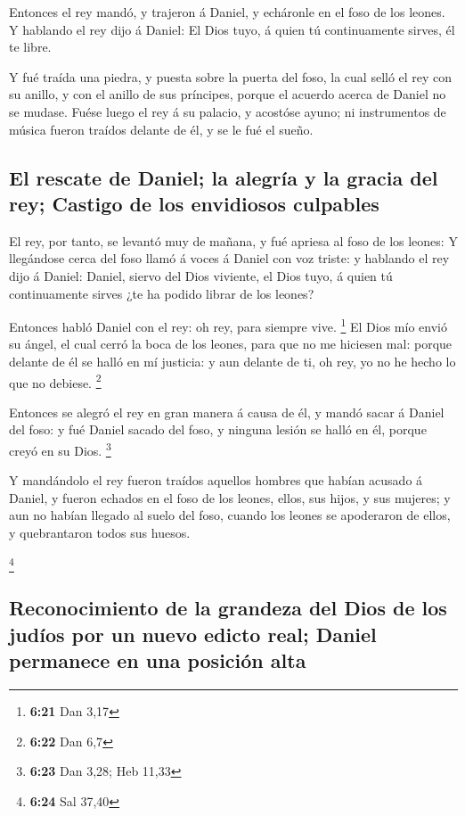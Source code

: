  Entonces el rey mandó, y trajeron á Daniel, y echáronle
en el foso de los leones. Y hablando el rey dijo á Daniel: El Dios tuyo,
á quien tú continuamente sirves, él te libre.

 Y fué traída una piedra, y puesta sobre la puerta del
foso, la cual selló el rey con su anillo, y con el anillo de sus
príncipes, porque el acuerdo acerca de Daniel no se mudase.
 Fuése luego el rey á su palacio, y acostóse ayuno; ni
instrumentos de música fueron traídos delante de él, y se le fué el
sueño.

\hypertarget{el-rescate-de-daniel-la-alegruxeda-y-la-gracia-del-rey-castigo-de-los-envidiosos-culpables}{%
\subsection{El rescate de Daniel; la alegría y la gracia del rey;
Castigo de los envidiosos
culpables}\label{el-rescate-de-daniel-la-alegruxeda-y-la-gracia-del-rey-castigo-de-los-envidiosos-culpables}}

 El rey, por tanto, se levantó muy de mañana, y fué
apriesa al foso de los leones:  Y llegándose cerca del
foso llamó á voces á Daniel con voz triste: y hablando el rey dijo á
Daniel: Daniel, siervo del Dios viviente, el Dios tuyo, á quien tú
continuamente sirves ¿te ha podido librar de los leones?

 Entonces habló Daniel con el rey: oh rey, para siempre
vive. \footnote{\textbf{6:21} Dan 3,17}  El Dios mío
envió su ángel, el cual cerró la boca de los leones, para que no me
hiciesen mal: porque delante de él se halló en mí justicia: y aun
delante de ti, oh rey, yo no he hecho lo que no debiese. \footnote{\textbf{6:22}
  Dan 6,7}

 Entonces se alegró el rey en gran manera á causa de él,
y mandó sacar á Daniel del foso: y fué Daniel sacado del foso, y ninguna
lesión se halló en él, porque creyó en su Dios. \footnote{\textbf{6:23}
  Dan 3,28; Heb 11,33}

 Y mandándolo el rey fueron traídos aquellos hombres que
habían acusado á Daniel, y fueron echados en el foso de los leones,
ellos, sus hijos, y sus mujeres; y aun no habían llegado al suelo del
foso, cuando los leones se apoderaron de ellos, y quebrantaron todos sus
huesos.

\footnote{\textbf{6:24} Sal 37,40}

\hypertarget{reconocimiento-de-la-grandeza-del-dios-de-los-juduxedos-por-un-nuevo-edicto-real-daniel-permanece-en-una-posiciuxf3n-alta}{%
\subsection{Reconocimiento de la grandeza del Dios de los judíos por un
nuevo edicto real; Daniel permanece en una posición
alta}\label{reconocimiento-de-la-grandeza-del-dios-de-los-juduxedos-por-un-nuevo-edicto-real-daniel-permanece-en-una-posiciuxf3n-alta}}

